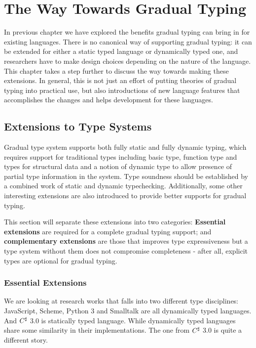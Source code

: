 
\renewcommand{\thechapter}{3}

\chapter{The Way Towards Gradual Typing}


In previous chapter we have explored the benefits gradual typing
can bring in for existing languages.
There is no canonical way of supporting gradual typing:
it can be extended for either a static typed language or dynamically typed one,
and researchers have to make design choices depending on the nature of the language.
This chapter takes a step further to discuss the way towards making these extensions.
In general, this is not just an effort of putting theories of gradual typing into practical use,
but also introductions of new language features that accomplishes the changes
and helps development for these languages.

\section{Extensions to Type Systems}

Gradual type system supports both fully static and fully dynamic typing,
which requires support for traditional types including
basic type, function type and types for structural data
and a notion of dynamic type to allow presence of partial type information in the system.
Type soundness should be established by a combined work of static and dynamic typechecking.
Additionally, some other interesting extensions are also introduced to provide better
supports for gradual typing.

This section will separate these extensions into two categories:
\textbf{Essential extensions} are required for a complete gradual typing support;
and \textbf{complementary extensions} are those that improves type expressiveness
but a type system without them does not compromise completeness - after all,
explicit types are optional for gradual typing.

\subsection{Essential Extensions}

We are looking at research works that falls into two different type disciplines:
JavaScript, Scheme, Python 3 and Smalltalk are all dynamically typed languages.
And $C^\sharp$ 3.0 is statically typed language.
While dynamically typed languages share some similarity in their implementations.
The one from $C^\sharp$ 3.0 is quite a different story.

